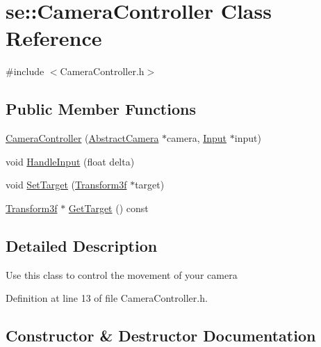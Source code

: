 \hypertarget{classse_1_1_camera_controller}{}\section{se\+:\+:Camera\+Controller Class Reference}
\label{classse_1_1_camera_controller}


{\ttfamily \#include $<$Camera\+Controller.\+h$>$}

\subsection*{Public Member Functions}
\begin{DoxyCompactItemize}
\item 
\mbox{\hyperlink{classse_1_1_camera_controller_a6dd7d1310527946f84729414b547ce5a}{Camera\+Controller}} (\mbox{\hyperlink{classse_1_1_abstract_camera}{Abstract\+Camera}} $\ast$camera, \mbox{\hyperlink{classse_1_1_input}{Input}} $\ast$input)
\item 
void \mbox{\hyperlink{classse_1_1_camera_controller_ab6bbdc5adfe20a96d28a53258e5de1a6}{Handle\+Input}} (float delta)
\item 
void \mbox{\hyperlink{classse_1_1_camera_controller_a7b9d137e927ce64aae6af3f21c64f1d5}{Set\+Target}} (\mbox{\hyperlink{classse_1_1_transform3f}{Transform3f}} $\ast$target)
\item 
\mbox{\hyperlink{classse_1_1_transform3f}{Transform3f}} $\ast$ \mbox{\hyperlink{classse_1_1_camera_controller_a5b63115409d37fd1aa893e27bb2444a3}{Get\+Target}} () const
\end{DoxyCompactItemize}


\subsection{Detailed Description}
Use this class to control the movement of your camera 

Definition at line 13 of file Camera\+Controller.\+h.



\subsection{Constructor \& Destructor Documentation}
\mbox{\label{classse_1_1_camera_controller_a6dd7d1310527946f84729414b547ce5a}} 
